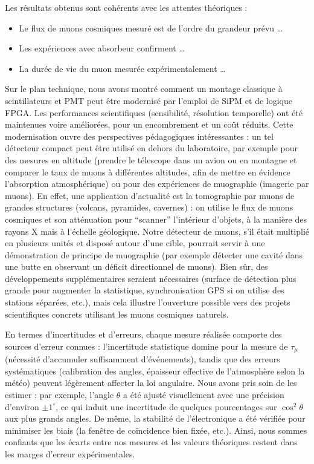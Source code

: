 \documentclass[a4paper,12pt,twoside]{article}
\begin{document}
Les résultats obtenus sont cohérents avec les attentes théoriques :
\begin{itemize}
  \item Le flux de muons cosmiques mesuré est de l’ordre du grandeur prévu …
  \item Les expériences avec absorbeur confirment …
  \item La durée de vie du muon mesurée expérimentalement …
\end{itemize}

Sur le plan technique, nous avons montré comment un montage classique à scintillateurs et PMT peut être modernisé par l’emploi de SiPM et de logique FPGA. Les performances scientifiques (sensibilité, résolution temporelle) ont été maintenues voire améliorées, pour un encombrement et un coût réduits. Cette modernisation ouvre des perspectives pédagogiques intéressantes : un tel détecteur compact peut être utilisé en dehors du laboratoire, par exemple pour des mesures en altitude (prendre le télescope dans un avion ou en montagne et comparer le taux de muons à différentes altitudes, afin de mettre en évidence l’absorption atmosphérique) ou pour des expériences de muographie (imagerie par muons). En effet, une application d’actualité est la tomographie par muons de grandes structures (volcans, pyramides, cavernes) : on utilise le flux de muons cosmiques et son atténuation pour “scanner” l’intérieur d’objets, à la manière des rayons X mais à l’échelle géologique. Notre détecteur de muons, s’il était multiplié en plusieurs unités et disposé autour d’une cible, pourrait servir à une démonstration de principe de muographie (par exemple détecter une cavité dans une butte en observant un déficit directionnel de muons). Bien sûr, des développements supplémentaires seraient nécessaires (surface de détection plus grande pour augmenter la statistique, synchronisation GPS si on utilise des stations séparées, etc.), mais cela illustre l'ouverture possible vers des projets scientifiques concrets utilisant les muons cosmiques naturels.

En termes d’incertitudes et d’erreurs, chaque mesure réalisée comporte des sources d’erreur connues : l’incertitude statistique domine pour la mesure de $\tau_\mu$ (nécessité d’accumuler suffisamment d’événements), tandis que des erreurs systématiques (calibration des angles, épaisseur effective de l’atmosphère selon la météo) peuvent légèrement affecter la loi angulaire. Nous avons pris soin de les estimer : par exemple, l’angle $\theta$ a été ajusté visuellement avec une précision d’environ $\pm 1^\circ$, ce qui induit une incertitude de quelques pourcentages sur $\cos^2\theta$ aux plus grands angles. De même, la stabilité de l’électronique a été vérifiée pour minimiser les biais (la fenêtre de coïncidence bien fixée, etc.). Ainsi, nous sommes confiants que les écarts entre nos mesures et les valeurs théoriques restent dans les marges d’erreur expérimentales.
\end{document}
